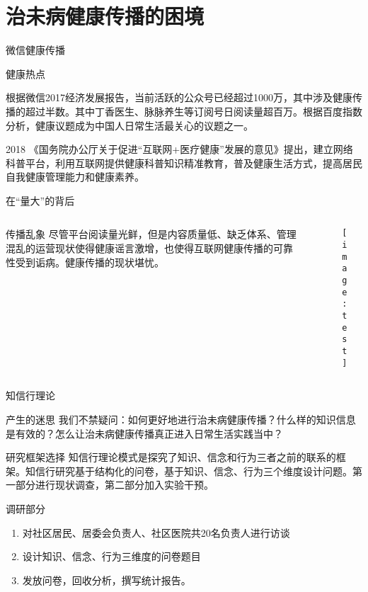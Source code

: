 \section{治未病健康传播的困境}
\begin{frame}{微信健康传播}
\begin{exampleblock}{健康热点}
    
根据微信2017经济发展报告，当前活跃的公众号已经超过1000万，其中涉及健康传播的超过半数。其中丁香医生、脉脉养生等订阅号日阅读量超百万。根据百度指数分析，健康议题成为中国人日常生活最关心的议题之一。
\end{exampleblock}
\begin{block}{2018}
    《国务院办公厅关于促进“互联网+医疗健康”发展的意见》提出，建立网络科普平台，利用互联网提供健康科普知识精准教育，普及健康生活方式，提高居民自我健康管理能力和健康素养。
\end{block}
\end{frame}

\begin{frame}{在“量大”的背后}
\begin{columns}
    \begin{column}{0.6\linewidth}
 
\begin{block}{传播乱象}
尽管平台阅读量光鲜，但是内容质量低、缺乏体系、管理混乱的运营现状使得健康谣言激增，也使得互联网健康传播的可靠性受到诟病。健康传播的现状堪忧。
\end{block}
\end{column}
\begin{column}{0.7\textwidth}
    \begin{figure}[h]
\texttt{[image: test]}
    \end{figure}
\end{column}
\end{columns}
\end{frame}

\begin{frame}{知信行理论}
\begin{block}{产生的迷思}
    我们不禁疑问：如何更好地进行治未病健康传播？什么样的知识信息是有效的？怎么让治未病健康传播真正进入日常生活实践当中？
\end{block}

\begin{block}{研究框架选择}
知信行理论模式是探究了知识、信念和行为三者之前的联系的框架。知信行研究基于结构化的问卷，基于知识、信念、行为三个维度设计问题。第一部分进行现状调查，第二部分加入实验干预。
\end{block}
\end{frame}
\begin{frame}{调研部分}
\begin{enumerate}
    \item 对社区居民、居委会负责人、社区医院共20名负责人进行访谈
    \item 设计知识、信念、行为三维度的问卷题目
    \item 发放问卷，回收分析，撰写统计报告。
\end{enumerate}
\end{frame}
